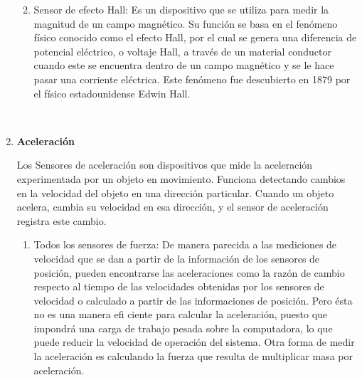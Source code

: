 \begin{enumerate}
\begin{enumerate}
				\begin{figure}[h]
					\centering
					\hfill
				\end{figure}
				
				\item Sensor de efecto Hall: Es un dispositivo que se utiliza para medir la magnitud de un campo magnético. Su función se basa en el fenómeno físico conocido como el efecto Hall, por el cual se genera una diferencia de potencial eléctrico, o voltaje Hall, a través de un material conductor cuando este se encuentra dentro de un campo magnético y se le hace pasar una corriente eléctrica. Este fenómeno fue descubierto en 1879 por el físico estadounidense Edwin Hall.\cite{Hall} \\
				
			\begin{figure}[h]
				\centering
				\hfill
				\\
			\end{figure}
			
			\end{enumerate}
			
			\item \textbf{Aceleración}
			
			Los Sensores de aceleración son dispositivos que mide la aceleración experimentada por un objeto en movimiento. Funciona detectando cambios en la velocidad del objeto en una dirección particular. Cuando un objeto acelera, cambia su velocidad en esa dirección, y el sensor de aceleración registra este cambio. \cite{Aceleración} \\
			
			\begin{enumerate}
				\item Todos los sensores de fuerza: De manera parecida a las mediciones de velocidad que se dan a partir de la información de los sensores de posición, pueden encontrarse las aceleraciones como la razón de cambio respecto al tiempo de las velocidades obtenidas por los sensores de velocidad o calculado a partir de las informaciones de posición. Pero ésta no es una manera efi ciente para calcular la aceleración, puesto que impondrá una carga de trabajo pesada sobre la computadora, lo que puede reducir la velocidad de operación del sistema. Otra forma de medir la aceleración es calculando la fuerza que resulta de multiplicar masa por aceleración. \cite{saha2010robotics}\\
			\end{enumerate}
				\begin{figure}[h]
				\centering
				\hfill
			\end{figure}
			

\end{enumerate}
